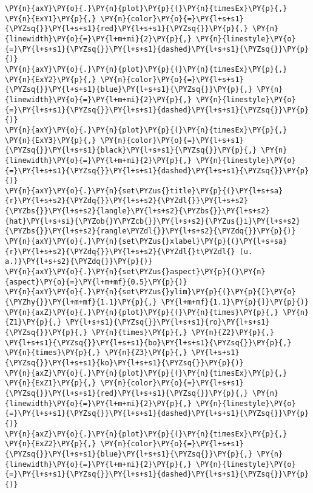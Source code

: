 \begin{tcolorbox}[breakable, size=fbox, boxrule=1pt, pad at break*=1mm,colback=cellbackground, colframe=cellborder]
\begin{Verbatim}[commandchars=\\\{\}]
\PY{n}{axY}\PY{o}{.}\PY{n}{plot}\PY{p}{(}\PY{n}{timesEx}\PY{p}{,} \PY{n}{ExY1}\PY{p}{,} \PY{n}{color}\PY{o}{=}\PY{l+s+s1}{\PYZsq{}}\PY{l+s+s1}{red}\PY{l+s+s1}{\PYZsq{}}\PY{p}{,} \PY{n}{linewidth}\PY{o}{=}\PY{l+m+mi}{2}\PY{p}{,} \PY{n}{linestyle}\PY{o}{=}\PY{l+s+s1}{\PYZsq{}}\PY{l+s+s1}{dashed}\PY{l+s+s1}{\PYZsq{}}\PY{p}{)}
\PY{n}{axY}\PY{o}{.}\PY{n}{plot}\PY{p}{(}\PY{n}{timesEx}\PY{p}{,} \PY{n}{ExY2}\PY{p}{,} \PY{n}{color}\PY{o}{=}\PY{l+s+s1}{\PYZsq{}}\PY{l+s+s1}{blue}\PY{l+s+s1}{\PYZsq{}}\PY{p}{,} \PY{n}{linewidth}\PY{o}{=}\PY{l+m+mi}{2}\PY{p}{,} \PY{n}{linestyle}\PY{o}{=}\PY{l+s+s1}{\PYZsq{}}\PY{l+s+s1}{dashed}\PY{l+s+s1}{\PYZsq{}}\PY{p}{)}
\PY{n}{axY}\PY{o}{.}\PY{n}{plot}\PY{p}{(}\PY{n}{timesEx}\PY{p}{,} \PY{n}{ExY3}\PY{p}{,} \PY{n}{color}\PY{o}{=}\PY{l+s+s1}{\PYZsq{}}\PY{l+s+s1}{black}\PY{l+s+s1}{\PYZsq{}}\PY{p}{,} \PY{n}{linewidth}\PY{o}{=}\PY{l+m+mi}{2}\PY{p}{,} \PY{n}{linestyle}\PY{o}{=}\PY{l+s+s1}{\PYZsq{}}\PY{l+s+s1}{dashed}\PY{l+s+s1}{\PYZsq{}}\PY{p}{)}
\PY{n}{axY}\PY{o}{.}\PY{n}{set\PYZus{}title}\PY{p}{(}\PY{l+s+sa}{r}\PY{l+s+s2}{\PYZdq{}}\PY{l+s+s2}{\PYZdl{}}\PY{l+s+s2}{\PYZbs{}}\PY{l+s+s2}{langle}\PY{l+s+s2}{\PYZbs{}}\PY{l+s+s2}{hat}\PY{l+s+si}{\PYZob{}Y\PYZcb{}}\PY{l+s+s2}{\PYZus{}i}\PY{l+s+s2}{\PYZbs{}}\PY{l+s+s2}{rangle\PYZdl{}}\PY{l+s+s2}{\PYZdq{}}\PY{p}{)}
\PY{n}{axY}\PY{o}{.}\PY{n}{set\PYZus{}xlabel}\PY{p}{(}\PY{l+s+sa}{r}\PY{l+s+s2}{\PYZdq{}}\PY{l+s+s2}{\PYZdl{}t\PYZdl{} (u. a.)}\PY{l+s+s2}{\PYZdq{}}\PY{p}{)}
\PY{n}{axY}\PY{o}{.}\PY{n}{set\PYZus{}aspect}\PY{p}{(}\PY{n}{aspect}\PY{o}{=}\PY{l+m+mf}{0.5}\PY{p}{)}
\PY{n}{axY}\PY{o}{.}\PY{n}{set\PYZus{}ylim}\PY{p}{(}\PY{p}{[}\PY{o}{\PYZhy{}}\PY{l+m+mf}{1.1}\PY{p}{,} \PY{l+m+mf}{1.1}\PY{p}{]}\PY{p}{)}
\PY{n}{axZ}\PY{o}{.}\PY{n}{plot}\PY{p}{(}\PY{n}{times}\PY{p}{,} \PY{n}{Z1}\PY{p}{,} \PY{l+s+s1}{\PYZsq{}}\PY{l+s+s1}{ro}\PY{l+s+s1}{\PYZsq{}}\PY{p}{,} \PY{n}{times}\PY{p}{,} \PY{n}{Z2}\PY{p}{,} \PY{l+s+s1}{\PYZsq{}}\PY{l+s+s1}{bo}\PY{l+s+s1}{\PYZsq{}}\PY{p}{,} \PY{n}{times}\PY{p}{,} \PY{n}{Z3}\PY{p}{,} \PY{l+s+s1}{\PYZsq{}}\PY{l+s+s1}{ko}\PY{l+s+s1}{\PYZsq{}}\PY{p}{)}
\PY{n}{axZ}\PY{o}{.}\PY{n}{plot}\PY{p}{(}\PY{n}{timesEx}\PY{p}{,} \PY{n}{ExZ1}\PY{p}{,} \PY{n}{color}\PY{o}{=}\PY{l+s+s1}{\PYZsq{}}\PY{l+s+s1}{red}\PY{l+s+s1}{\PYZsq{}}\PY{p}{,} \PY{n}{linewidth}\PY{o}{=}\PY{l+m+mi}{2}\PY{p}{,} \PY{n}{linestyle}\PY{o}{=}\PY{l+s+s1}{\PYZsq{}}\PY{l+s+s1}{dashed}\PY{l+s+s1}{\PYZsq{}}\PY{p}{)}
\PY{n}{axZ}\PY{o}{.}\PY{n}{plot}\PY{p}{(}\PY{n}{timesEx}\PY{p}{,} \PY{n}{ExZ2}\PY{p}{,} \PY{n}{color}\PY{o}{=}\PY{l+s+s1}{\PYZsq{}}\PY{l+s+s1}{blue}\PY{l+s+s1}{\PYZsq{}}\PY{p}{,} \PY{n}{linewidth}\PY{o}{=}\PY{l+m+mi}{2}\PY{p}{,} \PY{n}{linestyle}\PY{o}{=}\PY{l+s+s1}{\PYZsq{}}\PY{l+s+s1}{dashed}\PY{l+s+s1}{\PYZsq{}}\PY{p}{)}

\end{Verbatim}
\end{tcolorbox}
